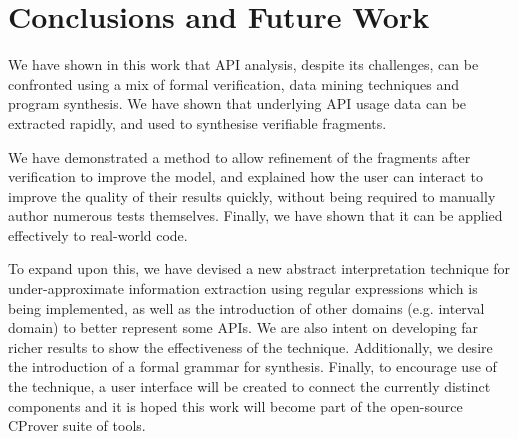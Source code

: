 \documentclass[EPiC]{easychair}
\begin{document}


\section{Conclusions and Future Work}
\label{sec:conclusions}
We have shown in this work that API analysis, despite its challenges, can be confronted using a mix of formal verification, data mining techniques and program synthesis.  We have shown that underlying API usage data can be extracted rapidly, and used to synthesise verifiable fragments.    

We have demonstrated a method to allow refinement of the fragments after verification to improve the model, and explained how the user can interact to improve the quality of their results quickly, without being required to manually author numerous tests themselves.  Finally, we have shown that it can be applied effectively to real-world code.

To expand upon this, we have devised a new abstract interpretation technique for under-approximate information extraction using regular expressions which is being implemented, as well as the introduction of other domains (e.g. interval domain) to better represent some APIs.   We are also intent on developing far richer results to show the effectiveness of the technique.  Additionally, we desire the introduction of a formal grammar for synthesis.
Finally, to encourage use of the technique, a user interface will be created to connect the currently distinct components and it is hoped this work will become part of the open-source CProver suite of tools.  
%



{}




\end{document}
